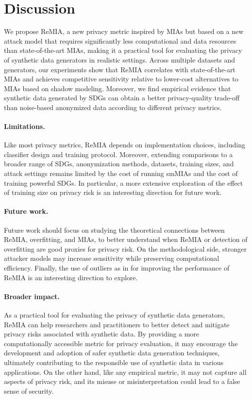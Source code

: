 \section{Discussion}
We propose ReMIA, a new privacy metric inspired by MIAs but based on a new attack model that requires significantly less computational and data resources than state-of-the-art MIAs, making it a practical tool for evaluating the privacy of synthetic data generators in realistic settings.
Across multiple datasets and generators, our experiments show that ReMIA correlates with state-of-the-art MIAs and achieves competitive sensitivity relative to lower-cost alternatives to MIAs based on shadow modeling.
Moreover, we find empirical evidence that synthetic data generated by SDGs can obtain a better privacy-quality trade-off than noise-based anonymized data according to different privacy metrics.


\paragraph{Limitations.}
Like most privacy metrics, ReMIA depends on implementation choices, including classifier design and training protocol.
Moreover, extending comparisons to a broader range of SDGs, anonymization methods, datasets, training sizes, and attack settings remains limited by the cost of running smMIAs and the cost of training powerful SDGs. In particular, a more extensive exploration of the effect of training size on privacy risk is an interesting direction for future work.

\paragraph{Future work.}
Future work should focus on studying the theoretical connections between ReMIA, overfitting, and MIAs, to better understand when ReMIA or detection of overfitting are good proxies for privacy risk.
On the methodological side, stronger attacker models may increase sensitivity while preserving computational efficiency.
Finally, the use of outliers as in \citet{meeus2023achilles} for improving the performance of ReMIA is an interesting direction to explore.

\paragraph{Broader impact.}
As a practical tool for evaluating the privacy of synthetic data generators, ReMIA can help researchers and practitioners to better detect and mitigate privacy risks associated with synthetic data. By providing a more computationally accessible metric for privacy evaluation, it may encourage the development and adoption of safer synthetic data generation techniques, ultimately contributing to the responsible use of synthetic data in various applications. On the other hand, like any empirical metric, it may not capture all aspects of privacy risk, and its misuse or misinterpretation could lead to a false sense of security.
